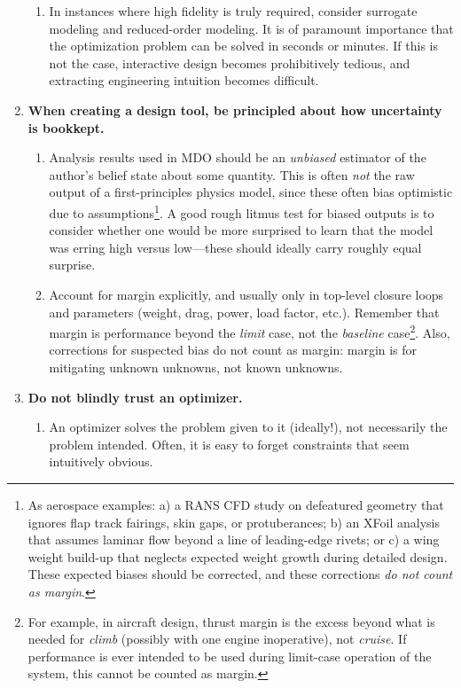 \begin{enumerate}
\begin{enumerate}
        \item In instances where high fidelity is truly required, consider surrogate modeling and reduced-order modeling. It is of paramount importance that the optimization problem can be solved in seconds or minutes. If this is not the case, interactive design becomes prohibitively tedious, and extracting engineering intuition becomes difficult.
    \end{enumerate}
    \item \textbf{When creating a design tool, be principled about how uncertainty is bookkept.}
    \begin{enumerate}
        \item Analysis results used in MDO should be an \emph{unbiased} estimator of the author's belief state about some quantity. This is often \emph{not} the raw output of a first-principles physics model, since these often bias optimistic due to assumptions\footnote{As aerospace examples: a) a RANS CFD study on defeatured geometry that ignores flap track fairings, skin gaps, or protuberances; b) an XFoil analysis that assumes laminar flow beyond a line of leading-edge rivets; or c) a wing weight build-up that neglects expected weight growth during detailed design. These expected biases should be corrected, and these corrections \emph{do not count as margin}.}. A good rough litmus test for biased outputs is to consider whether one would be more surprised to learn that the model was erring high versus low—these should ideally carry roughly equal surprise.
        \item Account for margin explicitly, and usually only in top-level closure loops and parameters (weight, drag, power, load factor, etc.). Remember that margin is performance beyond the \emph{limit} case, not the \emph{baseline} case\footnote{For example, in aircraft design, thrust margin is the excess beyond what is needed for \emph{climb} (possibly with one engine inoperative), not \emph{cruise}. If performance is ever intended to be used during limit-case operation of the system, this cannot be counted as margin.}. Also, corrections for suspected bias do not count as margin: margin is for mitigating unknown unknowns, not known unknowns.
    \end{enumerate}
    \item \textbf{Do not blindly trust an optimizer.}
    \begin{enumerate}
        \item An optimizer solves the problem given to it (ideally!), not necessarily the problem intended. Often, it is easy to forget constraints that seem intuitively obvious.

\end{enumerate}
\end{enumerate}
